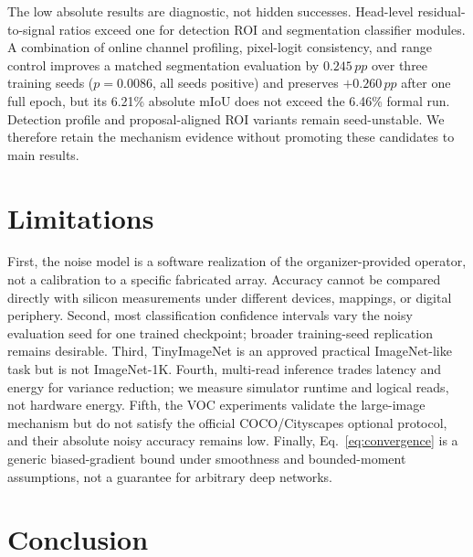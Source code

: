 \documentclass[10pt,twocolumn,letterpaper]{article}
\newcommand{\pp}{\,pp}
\begin{document}
The low absolute results are diagnostic, not hidden successes.  Head-level
residual-to-signal ratios exceed one for detection ROI and segmentation
classifier modules.  A combination of online channel profiling,
pixel-logit consistency, and range control improves a matched segmentation
evaluation by $0.245\pp$ over three training seeds ($p=0.0086$, all seeds positive)
and preserves $+0.260\pp$ after one full epoch, but its 6.21\% absolute mIoU
does not exceed the 6.46\% formal run.  Detection profile and proposal-aligned
ROI variants remain seed-unstable.  We therefore retain the mechanism evidence
without promoting these candidates to main results.

\section{Limitations}
\label{sec:limitations}

First, the noise model is a software realization of the organizer-provided
operator, not a calibration to a specific fabricated array.  Accuracy cannot be
compared directly with silicon measurements under different devices, mappings,
or digital periphery.  Second, most classification confidence intervals vary
the noisy evaluation seed for one trained checkpoint; broader training-seed
replication remains desirable.  Third, TinyImageNet is an approved practical
ImageNet-like task but is not ImageNet-1K.  Fourth, multi-read inference trades
latency and energy for variance reduction; we measure simulator runtime and
logical reads, not hardware energy.  Fifth, the VOC experiments validate the
large-image mechanism but do not satisfy the official COCO/Cityscapes optional
protocol, and their absolute noisy accuracy remains low.  Finally,
Eq.~\eqref{eq:convergence} is a generic biased-gradient bound under smoothness
and bounded-moment assumptions, not a guarantee for arbitrary deep networks.

\section{Conclusion}
\end{document}
